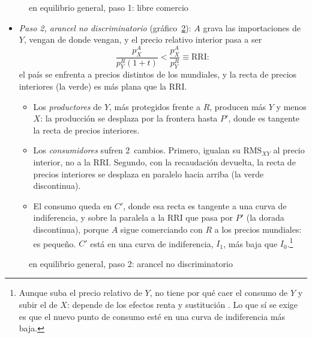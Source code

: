 \documentclass[11pt]{article}
\begin{document}
\begin{figure}[H]
\centering
\caption{ en equilibrio general, paso 1: libre comercio}\label{fig:lipsey-eg-paso1}
\end{figure}

\begin{itemize}
\item \emph{Paso 2, arancel no discriminatorio} (gráfico~\ref{fig:lipsey-eg-paso2}): $A$ grava las importaciones de $Y$, vengan de donde vengan, y el precio relativo interior pasa a ser
  \[
  \frac{p_X^A}{p_Y^R(1+t)}<\frac{p_X^A}{p_Y^R}\equiv\mathrm{RRI}:
  \]
  el país se enfrenta a precios distintos de los mundiales, y la recta de precios interiores (la verde) es más plana que la RRI.
  \begin{itemize}
  \item Los \emph{productores} de $Y$, más protegidos frente a $R$, producen más $Y$ y menos $X$: la producción se desplaza por la frontera hasta $P'$, donde es tangente la recta de precios interiores.
  \item Los \emph{consumidores} sufren 2~cambios. Primero, igualan su $\mathrm{RMS}_{XY}$ al precio interior, no a la RRI. Segundo, con la recaudación devuelta, la recta de precios interiores se desplaza en paralelo hacia arriba (la verde discontinua).
  \item El consumo queda en $C'$, donde esa recta es tangente a una curva de indiferencia, y sobre la paralela a la RRI que pasa por $P'$ (la dorada discontinua), porque $A$ sigue comerciando con $R$ a los precios mundiales: es pequeño. $C'$ está en una curva de indiferencia, $I_1$, más baja que $I_0$.\footnote{Aunque suba el precio relativo de $Y$, no tiene por qué caer el consumo de $Y$ y subir el de $X$: depende de los efectos renta y sustitución . Lo que sí se exige es que el nuevo punto de consumo esté en una curva de indiferencia más baja.}
  \end{itemize}
\end{itemize}

\begin{figure}[H]
\centering
\caption{ en equilibrio general, paso 2: arancel no discriminatorio}\label{fig:lipsey-eg-paso2}
\end{figure}
\end{document}
